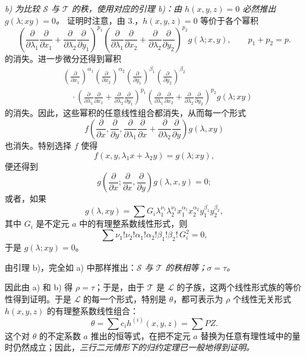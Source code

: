 \emph{b) 为比较 $\mathcal S$ 与 $\mathcal T$ 的秩，使用对应的引理 b)：由 $h(x,y,z)=0$ 必然推出 $g(\lambda;xy)=0$。} 证明时注意，由 3.，$h(x,y,z)=0$ 等价于各个幂积
\[
 \left(\frac{\partial}{\partial\lambda_1}\frac{\partial}{\partial x_1}
 +\frac{\partial}{\partial\lambda_2}\frac{\partial}{\partial y_1}\right)^{p_1}
 \left(\frac{\partial}{\partial\lambda_1}\frac{\partial}{\partial x_2}
 +\frac{\partial}{\partial\lambda_2}\frac{\partial}{\partial y_2}\right)^{p_2}g(\lambda;x,y),
 \qquad p_1+p_2=p.
\]
的消失。进一步微分还得到幂积
\[
\begin{aligned}
&\left(\frac{\partial}{\partial x_1}\right)^{\alpha_1}
 \left(\frac{\partial}{\partial x_2}\right)^{\alpha_2}
 \left(\frac{\partial}{\partial y_1}\right)^{\beta_1}
 \left(\frac{\partial}{\partial y_2}\right)^{\beta_2} \\
&\quad\cdot
 \left(\frac{\partial}{\partial\lambda_1}\frac{\partial}{\partial x_1}
 +\frac{\partial}{\partial\lambda_2}\frac{\partial}{\partial y_1}\right)^{p_1}
 \left(\frac{\partial}{\partial\lambda_1}\frac{\partial}{\partial x_2}
 +\frac{\partial}{\partial\lambda_2}\frac{\partial}{\partial y_2}\right)^{p_2}
 g(\lambda;xy)
\end{aligned}
\]
的消失。因此，这些幂积的任意线性组合都消失，从而每一个形式
\[
  f\left(\frac{\partial}{\partial x},\frac{\partial}{\partial y},
  \frac{\partial}{\partial\lambda_1}\frac{\partial}{\partial x}
  +\frac{\partial}{\partial\lambda_2}\frac{\partial}{\partial y}\right)g(\lambda,xy)
\]
也消失。特别选择 $f$ 使得
\[
  f(x,y,\lambda_1x+\lambda_2y)=g(\lambda;xy),
\]
便还得到
\[
  g\left(\frac{\partial}{\partial x};
    \frac{\partial}{\partial x},
    \frac{\partial}{\partial y}\right)g(\lambda,x,y)=0;
\]
或者，如果
\[
  g(\lambda,xy)=\sum G_i\lambda_1^{\nu_1}\lambda_2^{\nu_2}
  x_1^{\alpha_1}x_2^{\alpha_2}y_1^{\beta_1}y_2^{\beta_2},
\]
其中 $G_i$ 是不定元 $a$ 中的有理整系数线性形式，则
\[
  \sum \nu_1!\nu_2!\alpha_1!\alpha_2!\beta_1!\beta_2!\,G_i^2=0,
\]
于是 $g(\lambda;xy)=0$。

由引理 b)，完全如 a) 中那样推出：\emph{$\mathcal S$ 与 $\mathcal T$ 的秩相等；$\sigma=\tau$。}

因此由 a) 和 b) 得 $\rho=\tau$；于是，由于 $\mathcal T$ 是 $\mathcal L$ 的子族，这两个线性形式族的等价性得到证明。于是 $\mathcal L$ 的每一个形式，特别是 $\theta$，都可表示为 $\rho$ 个线性无关形式 $h(x,y,z)$ 的有理整系数线性组合：
\[
  \theta=\sum c_i h^{(i)}(x,y,z)=\sum PZ.
\]
这个对 $\theta$ 的不定系数 $a$ 推出的恒等式，在把不定元 $a$ 替换为任意有理性域中的量时仍然成立；因此，\emph{三行二元情形下的归约定理已一般地得到证明。}

